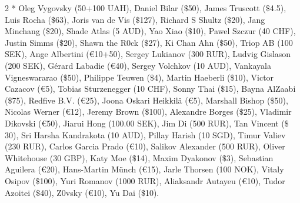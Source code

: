 %
%
%
%
\PTBRph{}%
\DEph{}\PLph{}%
\ITAph{}

2 * Oleg Vygovsky (50+100 UAH), 
Daniel Bilar ($\$$50), 
James Truscott ($\$$4.5),
Luis Rocha ($\$$63), 
Joris van de Vis ($\$$127), 
Richard S Shultz ($\$$20), 
Jang Minchang ($\$$20), 
Shade Atlas (5 AUD), 
Yao Xiao ($\$$10),
Pawel Szczur (40 CHF), 
Justin Simms ($\$$20), 
Shawn the R0ck ($\$$27), 
Ki Chan Ahn ($\$$50), 
Triop AB (100 SEK), 
Ange Albertini (\euro{}10+50),
Sergey Lukianov (300 RUR), 
Ludvig Gislason (200 SEK), 
Gérard Labadie (\euro{}40), 
Sergey Volchkov (10 AUD),
Vankayala Vigneswararao ($\$$50),
Philippe Teuwen ($\$$4),
Martin Haeberli ($\$$10),
Victor Cazacov (\euro{}5),
Tobias Sturzenegger (10 CHF),
Sonny Thai ($\$$15),
Bayna AlZaabi ($\$$75),
Redfive B.V. (\euro{}25),
Joona Oskari Heikkilä (\euro{}5),
Marshall Bishop ($\$$50),
Nicolas Werner (\euro{}12),
Jeremy Brown ($\$$100),
Alexandre Borges ($\$$25),
Vladimir Dikovski (\euro{}50),
Jiarui Hong (100.00 SEK),
Jim Di (500 RUR),
Tan Vincent ($\$$30),
Sri Harsha Kandrakota (10 AUD),
Pillay Harish (10 SGD),
Timur Valiev (230 RUR),
Carlos Garcia Prado (\euro{}10),
Salikov Alexander (500 RUR),
Oliver Whitehouse (30 GBP),
Katy Moe ($\$$14),
Maxim Dyakonov ($\$$3),
Sebastian Aguilera (\euro{}20),
Hans-Martin Münch (\euro{}15),
Jarle Thorsen (100 NOK),
Vitaly Osipov ($\$$100),
Yuri Romanov (1000 RUR),
Aliaksandr Autayeu (\euro{}10),
Tudor Azoitei ($\$$40),
Z0vsky (\euro{}10),
Yu Dai ($\$$10). 

%
%
%
%
\PTBRph{}%
\DEph{}\PLph{}%
\ITAph{}



\ifdefined\ebook
{}%
%
%
\PTBRph{}%
\DEph{}\PLph{}%
\ITAph{}

%
%
%
%
\PTBRph{}%
\DEph{}\PLph{}%
\ITAph{}

